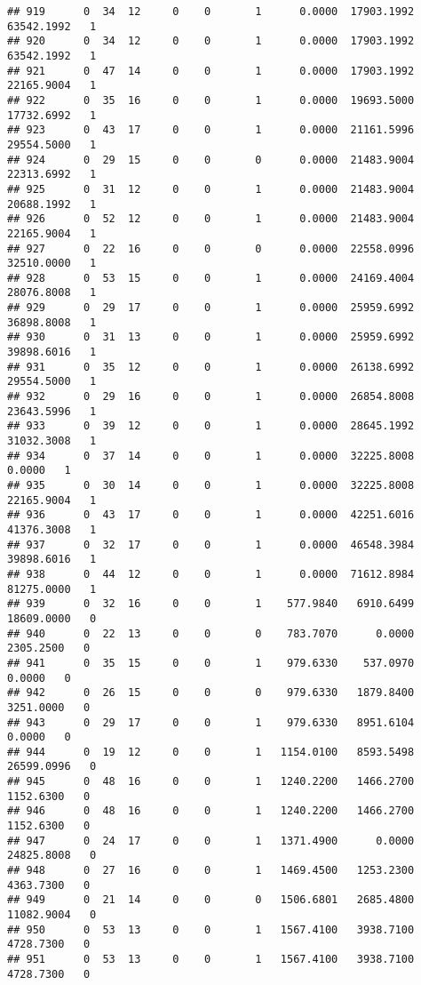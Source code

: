 \documentclass[
]{article}
\begin{document}
\begin{enumerate}
\begin{verbatim}
## 919      0  34  12     0    0       1      0.0000  17903.1992  63542.1992   1
## 920      0  34  12     0    0       1      0.0000  17903.1992  63542.1992   1
## 921      0  47  14     0    0       1      0.0000  17903.1992  22165.9004   1
## 922      0  35  16     0    0       1      0.0000  19693.5000  17732.6992   1
## 923      0  43  17     0    0       1      0.0000  21161.5996  29554.5000   1
## 924      0  29  15     0    0       0      0.0000  21483.9004  22313.6992   1
## 925      0  31  12     0    0       1      0.0000  21483.9004  20688.1992   1
## 926      0  52  12     0    0       1      0.0000  21483.9004  22165.9004   1
## 927      0  22  16     0    0       0      0.0000  22558.0996  32510.0000   1
## 928      0  53  15     0    0       1      0.0000  24169.4004  28076.8008   1
## 929      0  29  17     0    0       1      0.0000  25959.6992  36898.8008   1
## 930      0  31  13     0    0       1      0.0000  25959.6992  39898.6016   1
## 931      0  35  12     0    0       1      0.0000  26138.6992  29554.5000   1
## 932      0  29  16     0    0       1      0.0000  26854.8008  23643.5996   1
## 933      0  39  12     0    0       1      0.0000  28645.1992  31032.3008   1
## 934      0  37  14     0    0       1      0.0000  32225.8008      0.0000   1
## 935      0  30  14     0    0       1      0.0000  32225.8008  22165.9004   1
## 936      0  43  17     0    0       1      0.0000  42251.6016  41376.3008   1
## 937      0  32  17     0    0       1      0.0000  46548.3984  39898.6016   1
## 938      0  44  12     0    0       1      0.0000  71612.8984  81275.0000   1
## 939      0  32  16     0    0       1    577.9840   6910.6499  18609.0000   0
## 940      0  22  13     0    0       0    783.7070      0.0000   2305.2500   0
## 941      0  35  15     0    0       1    979.6330    537.0970      0.0000   0
## 942      0  26  15     0    0       0    979.6330   1879.8400   3251.0000   0
## 943      0  29  17     0    0       1    979.6330   8951.6104      0.0000   0
## 944      0  19  12     0    0       1   1154.0100   8593.5498  26599.0996   0
## 945      0  48  16     0    0       1   1240.2200   1466.2700   1152.6300   0
## 946      0  48  16     0    0       1   1240.2200   1466.2700   1152.6300   0
## 947      0  24  17     0    0       1   1371.4900      0.0000  24825.8008   0
## 948      0  27  16     0    0       1   1469.4500   1253.2300   4363.7300   0
## 949      0  21  14     0    0       0   1506.6801   2685.4800  11082.9004   0
## 950      0  53  13     0    0       1   1567.4100   3938.7100   4728.7300   0
## 951      0  53  13     0    0       1   1567.4100   3938.7100   4728.7300   0

\end{verbatim}
\end{enumerate}
\end{document}
